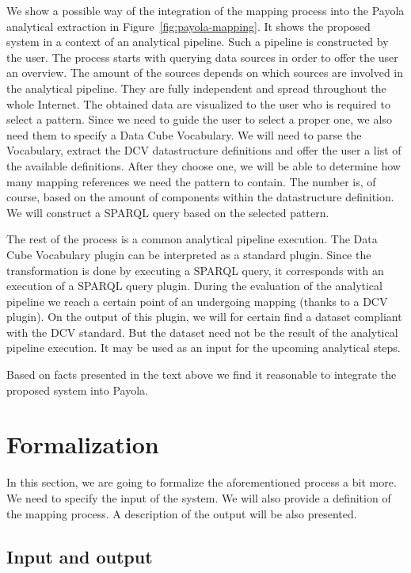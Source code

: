 We show a possible way of the integration of the mapping process into the Payola analytical extraction
in Figure~\ref{fig:payola-mapping}. It shows the proposed system in a context of an
analytical pipeline. Such a pipeline is constructed by the user. The process starts with querying data 
sources in order to offer the user an overview. The amount of the sources depends 
on which sources are involved in the analytical pipeline. They are fully independent 
and spread throughout the whole Internet. The obtained data are visualized to 
the user who is required to select a pattern. Since we need to guide the user 
to select a proper one, we also need them to specify a Data Cube Vocabulary. 
We will need to parse the Vocabulary, extract the DCV datastructure definitions 
and offer the user a list of the available definitions. After they choose one, we will be able to determine how many mapping references we need the 
pattern to contain. The number is, of course, based on the amount of components 
within the datastructure definition. We will construct a SPARQL query based on the selected pattern.

The rest of the process is a common analytical pipeline execution. The Data Cube 
Vocabulary plugin can be interpreted as a standard plugin. Since the 
transformation is done by executing a SPARQL query, it corresponds with an 
execution of a SPARQL query plugin. During the evaluation of the analytical pipeline we reach a certain point of an undergoing mapping (thanks to a DCV plugin). On the output of this plugin, we will for certain find a dataset compliant with the DCV standard. But the dataset need not 
be the result of the analytical pipeline execution. It may be used as an input 
for the upcoming analytical steps.

Based on facts presented in the text above we find it reasonable to integrate 
the proposed system into Payola.

\section{Formalization}

In this section, we are going to formalize the aforementioned process a bit 
more. We need to specify the input of the system. We will also 
provide a definition of the mapping process. A description of the output will be 
also presented.

\subsection{Input and output}

